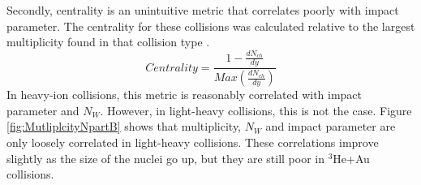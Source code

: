 \documentclass[twocolumn,showpacs,amsfonts,aps,prc,nofootinbib,floatfix]{revtex4}
\begin{document}
Secondly, centrality is an unintuitive metric that correlates poorly with impact parameter. The centrality for these collisions was calculated relative to the largest multiplicity found in that collision type \cite{Shen:2014vra}.
\begin{equation}
Centrality = \frac{1-\frac{dN_{ch}}{dy}}{Max(\frac{dN_{ch}}{dy})} 
\end{equation}
In heavy-ion collisions, this metric is reasonably correlated with impact parameter and $N_W$. However, in light-heavy collisions, this is not the case. Figure \ref{fig:MutliplcityNpartB} shows that multiplicity, $N_W$ and impact parameter are only loosely correlated in light-heavy collisions. These correlations improve slightly as the size of the nuclei go up, but they are still poor in $^3$He+Au collisions.
\end{document}
